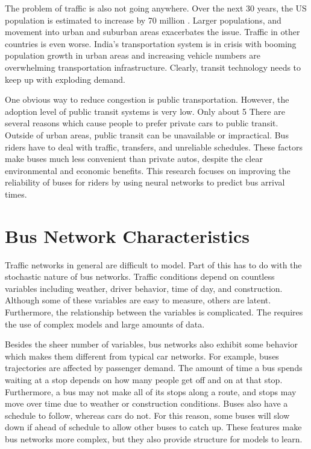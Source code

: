 
The problem of traffic is also not going anywhere.
Over the next 30 years, the US population is estimated to increase by 70 million \cite{traffic}.
Larger populations, and movement into urban and suburban areas exacerbates the issue.
Traffic in other countries is even worse.
India's transportation system is in crisis with booming population growth in urban areas and increasing vehicle numbers are overwhelming transportation infrastructure.
Clearly, transit technology needs to keep up with exploding demand.


One obvious way to reduce congestion is public transportation.
However, the adoption level of public transit systems is very low.
Only about 5%
There are several reasons which cause people to prefer private cars to public transit.
Outside of urban areas, public transit can be unavailable or impractical.
Bus riders have to deal with traffic, transfers, and unreliable schedules.
These factors make buses much less convenient than private autos, despite the clear environmental and economic benefits.
This research focuses on improving the reliability of buses for riders by using neural networks to predict bus arrival times.


\section{Bus Network Characteristics}


Traffic networks in general are difficult to model.
Part of this has to do with the stochastic nature of bus networks.
Traffic conditions depend on countless variables including weather, driver behavior, time of day, and construction.
Although some of these variables are easy to measure, others are latent.
Furthermore, the relationship between the variables is complicated.
The requires the use of complex models and large amounts of data.


Besides the sheer number of variables, bus networks also exhibit some behavior which makes them different from typical car networks.
For example, buses trajectories are affected by passenger demand.
The amount of time a bus spends waiting at a stop depends on how many people get off and on at that stop.
Furthermore, a bus may not make all of its stops along a route, and stops may move over time due to weather or construction conditions.
Buses also have a schedule to follow, whereas cars do not.
For this reason, some buses will slow down if ahead of schedule to allow other buses to catch up.
These features make bus networks more complex, but they also provide structure for models to learn.

